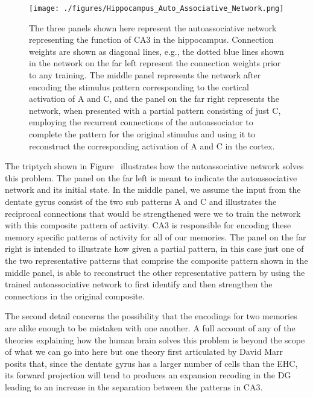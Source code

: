 \begin{figure}
%
  \begin{center}
    \texttt{[image: ./figures/Hippocampus\_Auto\_Associative\_Network.png]} %
  \end{center}
%
  \caption{The three panels shown here represent the autoassociative network representing the function of CA3 in the hippocampus. Connection weights are shown as diagonal lines, e.g., the dotted blue lines shown in the network on the far left represent the connection weights prior to any training. The middle panel represents the network after encoding the stimulus pattern corresponding to the cortical activation of A and C, and the panel on the far right represents the network, when presented with a partial pattern consisting of just C, employing the recurrent connections of the autoassociator to complete the pattern for the original stimulus and using it to reconstruct the corresponding activation of A and C in the cortex.}
%
  \label{fig_assoc}
%
\end{figure}


The triptych shown in Figure~{} illustrates how the autoassociative network solves this problem. The panel on the far left is meant to indicate the autoassociative network and its initial state. In the middle panel, we assume the input from the dentate gyrus consist of the two sub patterns A and C and illustrates the reciprocal connections that would be strengthened were we to train the network with this composite pattern of activity. CA3 is responsible for encoding these memory specific patterns of activity for all of our memories.  The panel on the far right is intended to illustrate how given a partial pattern, in this case just one of the two representative patterns that comprise the composite pattern shown in the middle panel, is able to reconstruct the other representative pattern by using the trained autoassociative network to first identify and then strengthen the connections in the original composite.

The second detail concerns the possibility that the encodings for two memories are alike enough to be mistaken with one another. A full account of any of the theories explaining how the human brain solves this problem is beyond the scope of what we can go into here but one theory \emdash{} first articulated by David Marr~\cite{MarrandBrindleyPTRS_B-71,WillshawetalPTRS_B-15} \emdash{} posits that, since the dentate gyrus has a larger number of cells than the EHC, its forward projection will tend to produces an expansion recoding in the DG leading to an increase in the separation between the patterns in CA3. %

